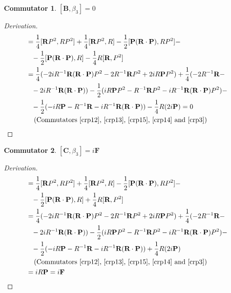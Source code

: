 \documentclass[12pt,a4paper]{report}
\theoremstyle{definition}
\newtheorem{commutator}{Commutator}[section]
\newenvironment{derivation}
  {\renewcommand\qedsymbol{$\square$}\begin{proof}[Derivation]}
  {\end{proof}}
\theoremstyle{remark}
\theoremstyle{remark}
\begin{document}
\begin{appendices}
\begin{commutator}\label{cbeta3.2}
$[\textbf{B},\beta_3]=0$
\end{commutator}
\begin{derivation}
\begin{align*}
[\textbf{B},\beta_3]&=\frac{1}{4}[\textbf{R}P^2,RP^2]+\frac{1}{4}[\textbf{R}P^2,R]-\frac{1}{2}[\textbf{P}(\textbf{R}\cdot\textbf{P}),RP^2]-\\
&\phantom{=}-\frac{1}{2}[\textbf{P}(\textbf{R}\cdot\textbf{P}),R]-\frac{1}{4}R[\textbf{R},P^2]\\
&=\frac{1}{4}(-2iR^{-1}\textbf{R}(\textbf{R}\cdot\textbf{P})P^2-2R^{-1}\textbf{R}P^2+2iR\textbf{P}P^2)+\frac{1}{4}(-2R^{-1}\textbf{R}-\\
&\phantom{=}-2iR^{-1}\textbf{R}(\textbf{R}\cdot\textbf{P}))-\frac{1}{2}(iR\textbf{P}P^2-R^{-1}\textbf{R}P^2-iR^{-1}\textbf{R}(\textbf{R}\cdot\textbf{P})P^2)-\\
&\phantom{=}-\frac{1}{2}(-iR\textbf{P}-R^{-1}\textbf{R}-iR^{-1}\textbf{R}(\textbf{R}\cdot\textbf{P}))-\frac{1}{4}R(2i\textbf{P})=0\\
&\phantom{=}\text{ (Commutators~\ref{crp12},~\ref{crp13},~\ref{crp15},~\ref{crp14} and~\ref{crp3})}\\
\end{align*}
\end{derivation}

\begin{commutator}\label{cbeta3.3}
$[\textbf{C},\beta_3]=i\textbf{F}$
\end{commutator}
\begin{derivation}
\begin{align*}
[\textbf{C},\beta_3]&=\frac{1}{4}[\textbf{R}P^2,RP^2]+\frac{1}{4}[\textbf{R}P^2,R]-\frac{1}{2}[\textbf{P}(\textbf{R}\cdot\textbf{P}),RP^2]-\\
&\phantom{=}-\frac{1}{2}[\textbf{P}(\textbf{R}\cdot\textbf{P}),R]+\frac{1}{4}R[\textbf{R},P^2]\\
&=\frac{1}{4}(-2iR^{-1}\textbf{R}(\textbf{R}\cdot\textbf{P})P^2-2R^{-1}\textbf{R}P^2+2iR\textbf{P}P^2)+\frac{1}{4}(-2R^{-1}\textbf{R}-\\
&\phantom{=}-2iR^{-1}\textbf{R}(\textbf{R}\cdot\textbf{P}))-\frac{1}{2}(iR\textbf{P}P^2-R^{-1}\textbf{R}P^2-iR^{-1}\textbf{R}(\textbf{R}\cdot\textbf{P})P^2)-\\
&\phantom{=}-\frac{1}{2}(-iR\textbf{P}-R^{-1}\textbf{R}-iR^{-1}\textbf{R}(\textbf{R}\cdot\textbf{P}))+\frac{1}{4}R(2i\textbf{P})\\
&\phantom{=}\text{ (Commutators~\ref{crp12},~\ref{crp13},~\ref{crp15},~\ref{crp14} and~\ref{crp3})}\\
&=iR\textbf{P}=i\textbf{F}
\end{align*}
\end{derivation}


\end{appendices}
\end{document}
